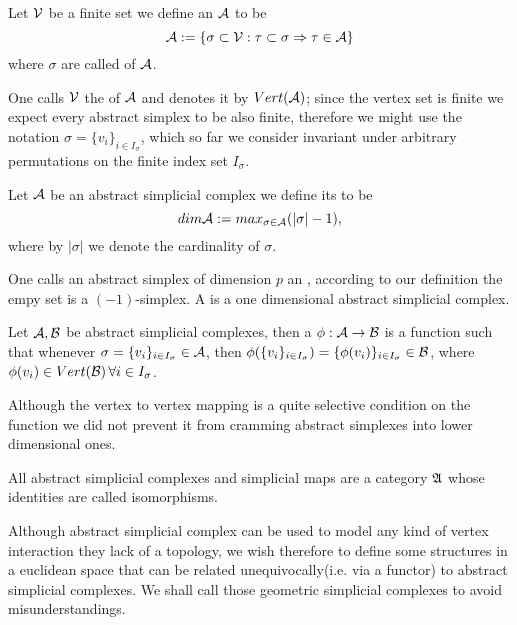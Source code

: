 \documentclass[../1.tex]{subfiles}
\begin{document}
    \begin{defn}
        Let $\mathcal{V}$ be a finite set we define an  $\mathcal{A}$ to be 
        \[\mathcal{A}:=\{ \sigma  \subset \mathcal{V} : \tau \subset \sigma \Rightarrow \tau \in \mathcal{A} \}\] 
        where $\sigma$ are called  of $\mathcal{A}$.
    \end{defn}
    
    {\color{red}
    One calls $\mathcal{V}$ the  of $\mathcal{A}$ and denotes it by $Vert(\mathcal{A})$; since the vertex
    set is finite we expect every abstract simplex to be also finite, therefore we might use the notation $\sigma = \{ v_i \}_{i \in I_\sigma}$,
    which so far we consider invariant under arbitrary permutations on the finite index set $I_\sigma$.}

    \begin{defn}
        Let $\mathcal{A}$ be an abstract simplicial complex we define its  to be
        \[ dim \mathcal{A} := max_{\sigma \in \mathcal{A}}(|\sigma|-1), \]
        where by $|\sigma|$ we denote the cardinality of $\sigma$.
    \end{defn}

    One calls an abstract simplex of dimension $p$ an , according to our
    definition the empy set is a $(-1)$-simplex. A  is a one dimensional abstract simplicial complex.

    \begin{defn}
        Let $\mathcal{A},\mathcal{B}$ be abstract simplicial complexes, then a  $\phi : \mathcal{A} \to \mathcal{B}$ is a function 
        such that whenever $\sigma = \{v_i\}_{i \in I_\sigma} \in \mathcal{A}$, then $\phi(\{v_i\}_{i \in I_\sigma}) = \{\phi(v_i)\}_{i \in I_\sigma} \in \mathcal{B}$,
        where $\phi(v_i) \in Vert(\mathcal{B}) \, \forall i \in I_\sigma$.
    \end{defn}

    Although the vertex to vertex mapping is a quite selective condition on the function we did not prevent it from cramming
    abstract simplexes into lower dimensional ones.

    \begin{thm}
        All abstract simplicial complexes and simplicial maps are a category $\mathfrak{A}$ whose identities are called isomorphisms.
    \end{thm}

    Although abstract simplicial complex can be used to model any kind of vertex interaction they lack of a topology, we wish
    therefore to define some structures in a euclidean space that can be related unequivocally(i.e. via a functor) to abstract simplicial complexes.
    We shall call those geometric simplicial complexes to avoid misunderstandings.
        
\end{document}

